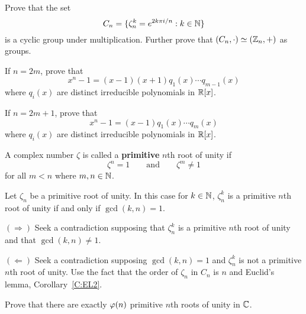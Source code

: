 \documentclass{ximera}
\begin{document}
\begin{exercise}\label{E:KN} Prove that the set 
\[
C_n = \{\zeta_n^k = e^{2k\pi i/n}: k\in \mathbb N\}
\]
is a cyclic group under multiplication. Further prove that
$(C_n,\cdot) \simeq (\mathbb Z_n,+)$ as groups.
\end{exercise}



\begin{exercise}
If $n = 2m$, prove that 
\[
x^n -1 = (x-1)(x+1)q_1(x) \cdots q_{m-1}(x)
\]
where $q_i(x)$ are distinct irreducible polynomials in $\mathbb R[x]$. 
\end{exercise}

\begin{exercise}
If $n = 2m+1$, prove that 
\[
x^n -1 = (x-1)q_1(x) \cdots q_{m}(x)
\]
where $q_i(x)$ are distinct irreducible polynomials in $\mathbb R[x]$. 
\end{exercise}


\begin{definition} 
  A complex number $\zeta$ is called a \textbf{primitive} $n$th root
  of unity if
  \[
  \zeta^n = 1 \qquad\text{and}\qquad \zeta^{m} \ne 1
  \]
  for all $m< n$ where $m,n\in\mathbb N$.
\end{definition}


\begin{theorem} 
Let $\zeta_n$ be a primitive root of unity. In this case for $k\in\mathbb N$,
$\zeta_n^k$ is a primitive $n$th root of unity if and only if
$\gcd(k,n) = 1$.

\begin{sketch} 
$(\Rightarrow)$ Seek a contradiction supposing that $\zeta_n^k$ is a
  primitive $n$th root of unity and that $\gcd(k,n) \ne 1$.

$(\Leftarrow)$ Seek a contradiction supposing $\gcd(k,n) = 1$ and
  $\zeta_n^k$ is not a primitive $n$th root of unity. Use the fact
  that the order of $\zeta_n$ in $C_n$ is $n$ and Euclid's lemma,
  Corollary~\ref{C:EL2}.
\end{sketch}
\end{theorem}



\begin{exercise}
  Prove that there are exactly $\eulerphi(n)$ primitive $n$th roots of
  unity in $\mathbb C$.
\end{exercise}
\end{document}

